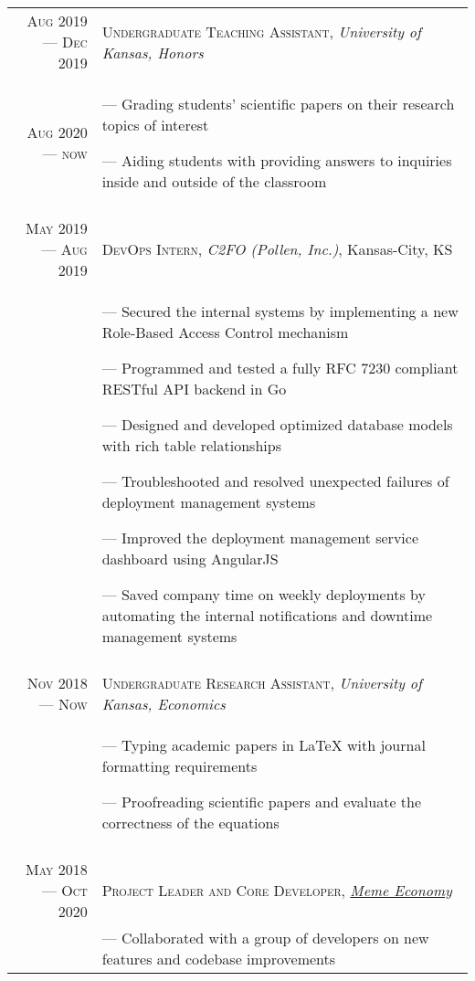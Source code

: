 \documentclass[letterpaper, 10pt]{article}
\begin{document}
\begin{tabular}{r|p{12cm}}
	\textsc{Aug 2019 --- Dec 2019} & \textsc{Undergraduate Teaching Assistant}, \emph{University of Kansas, Honors}              \\ \textsc{Aug 2020 --- now} &\footnotesize{
		--- Grading students' scientific papers on their research topics of interest

		--- Aiding students with providing answers to inquiries inside and outside of the classroom
	}                                                                                                                            \\\multicolumn{2}{c}{}\\

	\textsc{May 2019 --- Aug 2019} & \textsc{DevOps Intern}, \emph{C2FO (Pollen, Inc.)}, Kansas-City, KS                         \\&\footnotesize{
		--- Secured the internal systems by implementing a new Role-Based Access Control mechanism

		--- Programmed and tested a fully RFC 7230 compliant RESTful API backend in Go

		--- Designed and developed optimized database models with rich table relationships

		--- Troubleshooted and resolved unexpected failures of deployment management systems

		--- Improved the deployment management service dashboard using AngularJS

		--- Saved company time on weekly deployments by automating the internal notifications and downtime management systems
	}                                                                                                                            \\\multicolumn{2}{c}{}\\

	\textsc{Nov 2018 --- Now}      & \textsc{Undergraduate Research Assistant}, \emph{University of Kansas, Economics}           \\&\footnotesize{
		--- Typing academic papers in \LaTeX{} with journal formatting requirements

		--- Proofreading scientific papers and evaluate the correctness of the equations
	}                                                                                                                            \\\multicolumn{2}{c}{}\\

	\textsc{May 2018 --- Oct 2020} & \textsc{Project Leader and Core Developer}, \emph{\href{https://meme.market}{Meme Economy}} \\&\footnotesize{
		--- Collaborated with a group of developers on new features and codebase improvements

}
\end{tabular}
\end{document}
